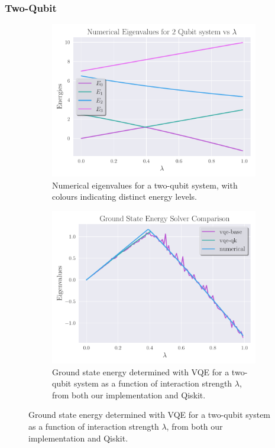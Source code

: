 \documentclass{beamer}
\begin{document}
\begin{frame}[t]
\end{frame}

\begin{frame}[t]
	\frametitle{Two-Qubit}
	\begin{figure}[ht]
		\centering
		\begin{subfigure}[b]{0.45\textwidth}
		\begin{center}
			\includegraphics[width=\textwidth]{../src/plots/eigs-2-cl.pdf}
		\end{center}
		\caption{Numerical eigenvalues for a two-qubit system, with colours indicating distinct energy levels.}
		\label{fig:eig-2}
		\end{subfigure}
		\hfill
		\begin{subfigure}[b]{0.45\textwidth}
		\begin{center}
			\includegraphics[width=\textwidth]{../src/plots/2qb-all.pdf}	
		\end{center}
		\caption{Ground state energy determined with VQE for a two-qubit system as a function of interaction strength $\lambda$, from both our implementation and Qiskit.}
		\label{fig:2-qb-all}
		\end{subfigure}
		\label{fig:2-qb}
	\end{figure}
\end{frame}
\end{document}
